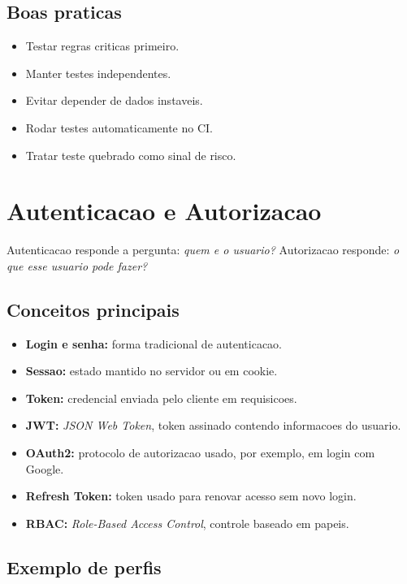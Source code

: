 \documentclass[12pt,a4paper]{article}
\begin{document}
\subsection{Boas praticas}

\begin{itemize}
  \item Testar regras criticas primeiro.
  \item Manter testes independentes.
  \item Evitar depender de dados instaveis.
  \item Rodar testes automaticamente no CI.
  \item Tratar teste quebrado como sinal de risco.
\end{itemize}

\section{Autenticacao e Autorizacao}

Autenticacao responde a pergunta: \textit{quem e o usuario?} Autorizacao responde: \textit{o que esse usuario pode fazer?}

\subsection{Conceitos principais}

\begin{itemize}
  \item \textbf{Login e senha:} forma tradicional de autenticacao.
  \item \textbf{Sessao:} estado mantido no servidor ou em cookie.
  \item \textbf{Token:} credencial enviada pelo cliente em requisicoes.
  \item \textbf{JWT:} \textit{JSON Web Token}, token assinado contendo informacoes do usuario.
  \item \textbf{OAuth2:} protocolo de autorizacao usado, por exemplo, em login com Google.
  \item \textbf{Refresh Token:} token usado para renovar acesso sem novo login.
  \item \textbf{RBAC:} \textit{Role-Based Access Control}, controle baseado em papeis.
\end{itemize}

\subsection{Exemplo de perfis}
\end{document}
